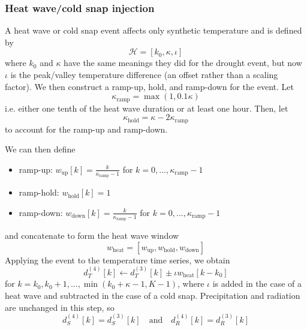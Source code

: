 \documentclass[preprint,12pt]{elsarticle}
\newcommand{\df}[2]{\displaystyle\frac{#1}{#2}}
\begin{document}
\subsubsection{Heat wave/cold snap injection}\label{subsubsec:heat-wave-injection}

A heat wave or cold snap event affects only synthetic temperature and is defined by
\begin{equation}
\mathcal{H} = [k_{0}, \kappa, \iota]
\label{eqn:heatwave-event}
\end{equation}
where $k_{0}$ and $\kappa$ have the same meanings they did for the drought event, but now $\iota$ is the peak/valley temperature difference (an offset rather than a scaling factor). We then construct a ramp-up, hold, and ramp-down for the event. Let
\begin{equation}
\kappa_{\text{ramp}} = \max(1, 0.1\kappa)
\label{eqn:kappa-ramp}
\end{equation}
i.e. either one tenth of the heat wave duration or at least one hour. Then, let
\begin{equation}
\kappa_{\text{hold}} = \kappa - 2\kappa_{\text{ramp}}
\label{eqn:kappa-hold}
\end{equation}
to account for the ramp-up and ramp-down.

We can then define
\begin{itemize}
\item ramp-up:   $w_{\text{up}}[k]   = \df{k}{\kappa_{\text{ramp}} - 1}$ for $k=0,...,\kappa_{\text{ramp}} - 1$
\item ramp-hold: $w_{\text{hold}}[k] = 1$
\item ramp-down: $w_{\text{down}}[k] = \df{k}{\kappa_{\text{ramp}} - 1}$ for $k=0,...,\kappa_{\text{ramp}} - 1$
\end{itemize}
and concatenate to form the heat wave window
\begin{equation}
w_{\text{heat}} = [w_{\text{up}}, w_{\text{hold}}, w_{\text{down}}]
\label{eqn:w-heat}
\end{equation}
Applying the event to the temperature time series, we obtain
\begin{equation}
d_{T}^{(4)}[k] \leftarrow d_{T}^{(3)}[k] \pm \iota w_{\text{heat}}[k - k_{0}]
\label{eqn:T4a}
\end{equation}
for $k=k_{0}, k_{0}+1,...,\min(k_{0}+ \kappa - 1, K-1)$, where $\iota$ is added in the case of a heat wave and subtracted in the case of a cold snap. Precipitation and radiation are unchanged in this step, so
\begin{equation}
d_{S}^{(4)}[k] = d_{S}^{(3)}[k] \quad \text{and} \quad d_{R}^{(4)}[k] = d_{R}^{(3)}[k]
\label{eqn:P4P3-R4R3}
\end{equation}
\end{document}
